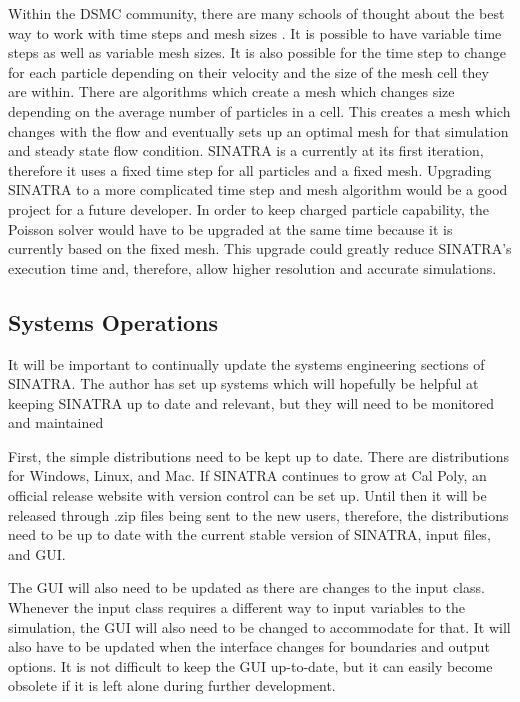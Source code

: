 \indent Within the DSMC community, there are many schools of thought about the best way to work with time steps and mesh sizes \cite{bird_dsmc}. It is possible to have variable time steps as well as variable mesh sizes. It is also possible for the time step to change for each particle depending on their velocity and the size of the mesh cell they are within. There are algorithms which create a mesh which changes size depending on the average number of particles in a cell. This creates a mesh which changes with the flow and eventually sets up an optimal mesh for that simulation and steady state flow condition. SINATRA is a currently at its first iteration, therefore it uses a fixed time step for all particles and a fixed mesh. Upgrading SINATRA to a more complicated time step and mesh algorithm would be a good project for a future developer. In order to keep charged particle capability, the Poisson solver would have to be upgraded at the same time because it is currently based on the fixed mesh. This upgrade could greatly reduce SINATRA’s execution time and, therefore, allow higher resolution and accurate simulations. \par

\subsection{Systems Operations}

It will be important to continually update the systems engineering sections of SINATRA. The author has set up systems which will hopefully be helpful at keeping SINATRA up to date and relevant, but they will need to be monitored and maintained
 \par

\indent First, the simple distributions need to be kept up to date. There are distributions for Windows, Linux, and Mac. If SINATRA continues to grow at Cal Poly, an official release website with version control can be set up. Until then it will be released through .zip files being sent to the new users, therefore, the distributions need to be up to date with the current stable version of SINATRA, input files, and GUI. \par

\indent The GUI will also need to be updated as there are changes to the input class. Whenever the input class requires a different way to input variables to the simulation, the GUI will also need to be changed to accommodate for that. It will also have to be updated when the interface changes for boundaries and output options. It is not difficult to keep the GUI up-to-date, but it can easily become obsolete if it is left alone during further development. \par

